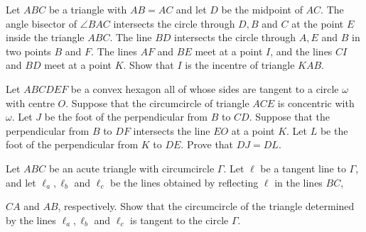 \item[\textbf{G6.}]
Let 
$ABC$
 be a triangle with 
$AB=AC$
 and let 
$D$
 be the midpoint of 
$AC$.
 The angle bisector of 
$\angle BAC$
 intersects the circle through 
$D,B$
  and 
$C$
 at the point 
$E$
  inside the triangle 
$ABC$.
 The line 
$BD$
 intersects the circle through 
$A,E$
 and 
$B$
 in two points 
$B$
 and 
$F$.
 The lines 
$AF$
 and 
$BE$
 meet at a point 
$I$, 
 and the lines 
$CI$
 and 
$BD$
 meet at a point 
$K$.
 Show that 
$I$
 is the incentre of triangle 
$KAB$.

\item[\textbf{G7.}]
Let 
$ABCDEF$
 be a convex hexagon all of whose sides are tangent to a circle 
$\omega$
 with centre 
$O$.
 Suppose that the circumcircle of triangle 
$ACE$
 is concentric with 
$\omega$.
 Let 
$J$
 be the foot of the perpendicular from 
$B$
 to 
$CD$.
 Suppose that the perpendicular from 
$B$
 to 
$DF$
 intersects the line 
$EO$
 at a point 
$K$.
 Let 
$L$
 be the foot of the perpendicular from 
$K$
 to 
$DE$.
 Prove that 
$DJ=DL$.

\item[\textbf{G8.}]
Let 
$ABC$
 be an acute triangle with circumcircle 
$\Gamma$.
 Let 
$\ell$
 be a tangent line to 
$\Gamma$, 
 and let 
$\ell_a, \ell_b$
 and 
$\ell_c$
 be the lines obtained by reflecting 
$\ell$
 in the lines 
$BC$, 
 
$CA$
 and 
$AB$, 
 respectively. Show that the circumcircle of the triangle determined by the lines 
$\ell_a, \ell_b$
 and 
$\ell_c$
 is tangent to the circle 
$\Gamma$.

